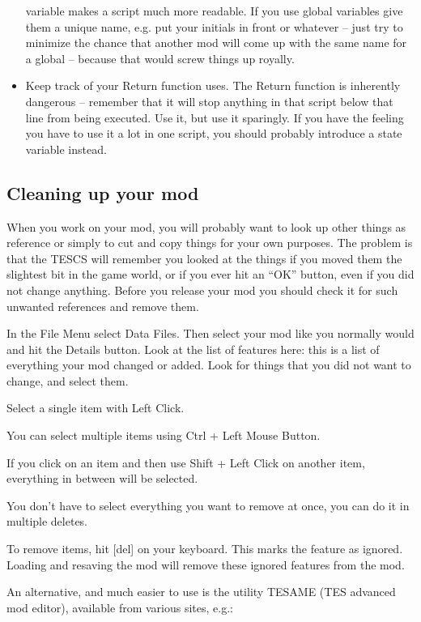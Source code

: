 \begin{itemize}
  variable makes a script much more readable. If you use global
  variables give them a unique name, e.g. put your initials in front or
  whatever -- just try to minimize the chance that another mod will come
  up with the same name for a global -- because that would screw things
  up royally.
\item
  Keep track of your Return function uses. The Return function is
  inherently dangerous -- remember that it will stop anything in that
  script below that line from being executed. Use it, but use it
  sparingly. If you have the feeling you have to use it a lot in one
  script, you should probably introduce a state variable instead.
\end{itemize}

\hypertarget{cleaning-up-your-mod}{%
\subsection{\texorpdfstring{\hfill\break
Cleaning up your
mod}{ Cleaning up your mod}}\label{cleaning-up-your-mod}}

When you work on your mod, you will probably want to look up other
things as reference or simply to cut and copy things for your own
purposes. The problem is that the TESCS will remember you looked at the
things if you moved them the slightest bit in the game world, or if you
ever hit an ``OK'' button, even if you did not change anything. Before
you release your mod you should check it for such unwanted references
and remove them.

In the File Menu select Data Files. Then select your mod like you
normally would and hit the Details button. Look at the list of features
here: this is a list of everything your mod changed or added. Look for
things that you did not want to change, and select them.

Select a single item with Left Click.

You can select multiple items using Ctrl + Left Mouse Button.

If you click on an item and then use Shift + Left Click on another item,
everything in between will be selected.

You don't have to select everything you want to remove at once, you can
do it in multiple deletes.

To remove items, hit {[}del{]} on your keyboard. This marks the feature
as ignored. Loading and resaving the mod will remove these ignored
features from the mod.

An alternative, and much easier to use is the utility TESAME (TES
advanced mod editor), available from various sites, e.g.:

